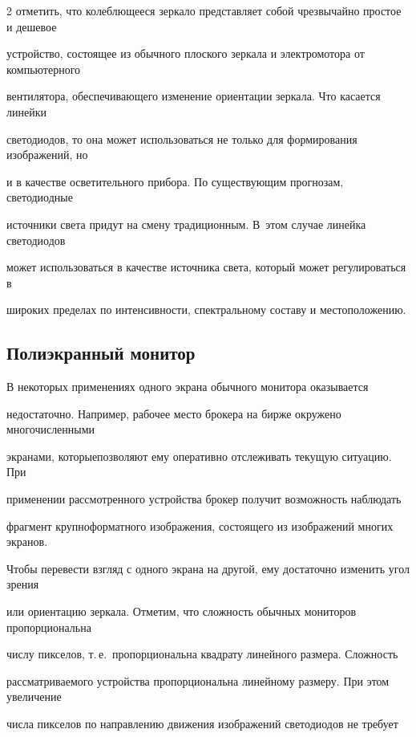 \begin{multicols}{2}
отметить, что колеблющееся зеркало представляет собой чрезвычайно простое и дешевое 

устройство, состоящее из обычного плоского зеркала и электромотора от компьютерного 

вентилятора, обеспечивающего изменение ориентации зеркала. Что касается линейки 

светодиодов, то она может использоваться не только для формирования изображений, но 

и в качестве осветительного прибора. По существующим прогнозам, светодиодные 

источники света придут на смену традиционным. В~этом случае линейка светодиодов 

может использоваться в качестве источника света, который может регулироваться в 

широких пределах по интенсивности, спектральному составу и местоположению. 





\subsection{Полиэкранный монитор}



  В некоторых применениях одного экрана обычного монитора оказывается 

недостаточно. На\-при\-мер, рабочее место брокера на бирже окружено многочисленными 

экранами, которые\linebreak позволяют ему оперативно отслеживать текущую ситуацию. При 

применении рассмотренного устройства брокер получит возможность наблюдать 

фрагмент крупноформатного изображения, состоящего из изображений многих экранов. 

Чтобы перевести взгляд с одного экрана на другой, ему достаточно изменить угол зрения 

или ориентацию зеркала. Отметим, что сложность обычных мониторов пропорциональна 

числу пикселов, т.\,е.\ пропорциональна квадрату линейного размера. Сложность 

рас\-смат\-ри\-ва\-емо\-го устройства пропорциональна линейному размеру. При этом увеличение 

числа пикселов по направлению движения изображений светодиодов не требует 


\end{multicols}
